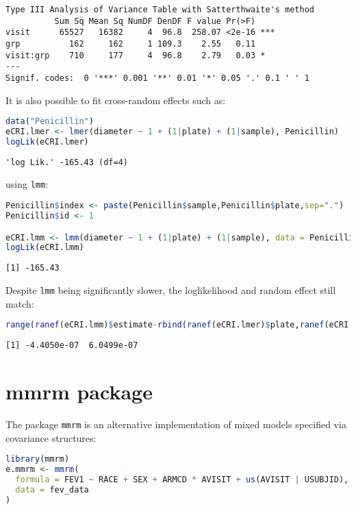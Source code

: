 \documentclass[12pt]{article}
\begin{document}
\label{}
\begin{verbatim}
Type III Analysis of Variance Table with Satterthwaite's method
          Sum Sq Mean Sq NumDF DenDF F value Pr(>F)    
visit      65527   16382     4  96.8  258.07 <2e-16 ***
grp          162     162     1 109.3    2.55   0.11    
visit:grp    710     177     4  96.8    2.79   0.03 *  
---
Signif. codes:  0 '***' 0.001 '**' 0.01 '*' 0.05 '.' 0.1 ' ' 1
\end{verbatim}


It is also possible to fit cross-random effects such as:
\begin{lstlisting}[language=r,numbers=none]
data("Penicillin")
eCRI.lmer <- lmer(diameter ~ 1 + (1|plate) + (1|sample), Penicillin)
logLik(eCRI.lmer)
\end{lstlisting}

\label{}
\begin{verbatim}
'log Lik.' -165.43 (df=4)
\end{verbatim}



using \texttt{lmm}:
\begin{lstlisting}[language=r,numbers=none]
Penicillin$index <- paste(Penicillin$sample,Penicillin$plate,sep=".")
Penicillin$id <- 1

eCRI.lmm <- lmm(diameter ~ 1 + (1|plate) + (1|sample), data = Penicillin)
logLik(eCRI.lmm)
\end{lstlisting}

\label{}
\begin{verbatim}
[1] -165.43
\end{verbatim}


Despite \texttt{lmm} being significantly slower, the loglikelihood and random
effect still match:
\begin{lstlisting}[language=r,numbers=none]
range(ranef(eCRI.lmm)$estimate-rbind(ranef(eCRI.lmer)$plate,ranef(eCRI.lmer)$sample))
\end{lstlisting}

\label{}
\begin{verbatim}
[1] -4.4050e-07  6.0499e-07
\end{verbatim}


\clearpage
\section{mmrm package}
\label{sec:org0402f2b}

The package \texttt{mmrm} is an alternative implementation of mixed models
specified via covariance structures:
\begin{lstlisting}[language=r,numbers=none]
library(mmrm)
e.mmrm <- mmrm(
  formula = FEV1 ~ RACE + SEX + ARMCD * AVISIT + us(AVISIT | USUBJID),
  data = fev_data
)
\end{lstlisting}
\end{document}
